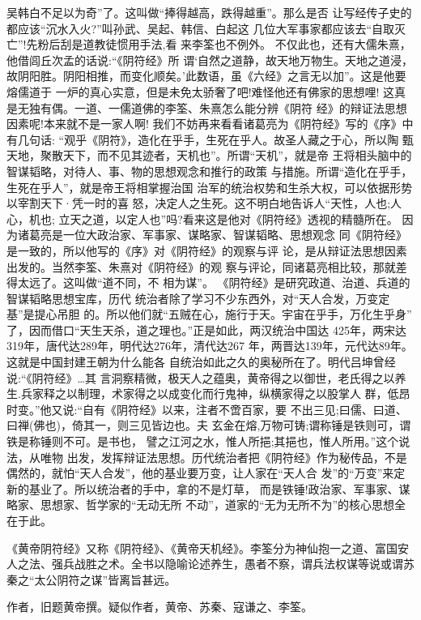 \documentclass[12pt,UTF8]{ctexbook}
\begin{document}
吴韩白不足以为奇”了。这叫做“捧得越高，跌得越重”。那么是否
让写经传子史的都应该“沉水入火?”叫孙武、吴起、韩信、白起这
几位大军事家都应该去“自取灭亡”!先粉后刮是道教徒惯用手法,看
来李筌也不例外。
不仅此也，还有大儒朱熹，他借闾丘次孟的话说:“《阴符经》所
谓‘自然之道静，故天地万物生。天地之道浸，故阴阳胜。阴阳相推，而变化顺矣。’此数语，虽《六经》之言无以加”。这是他要熔儒道于
一炉的真心实意，但是未免太骄奢了吧!难怪他还有佛家的思想哩!
这真是无独有偶。一道、一儒道佛的李筌、朱熹怎么能分辨《阴符
经》的辩证法思想因素呢!本来就不是一家人啊!
我们不妨再来看看诸葛亮为《阴符经》写的《序》中有几句话:
“观乎《阴符》，造化在乎手，生死在乎人。故圣人藏之于心，所以陶
甄天地，聚散天下，而不见其迹者，天机也”。所谓“天机”，就是帝
王将相头脑中的智谋韬略，对待人、事、物的思想观念和推行的政策
与措施。所谓“造化在乎手，生死在乎人”，就是帝王将相掌握治国
治军的统治权势和生杀大权，可以依据形势以宰割天下·凭一时的喜
怒，决定人之生死。这不明白地告诉人“天性，人也;人心，机也;
立天之道，以定人也”吗?看来这是他对《阴符经》透视的精髓所在。
因为诸葛亮是一位大政治家、军事家、谋略家、智谋韬略、思想观念
同《阴符经》是一致的，所以他写的《序》对《阴符经》的观察与评
论，是从辩证法思想因素出发的。当然李筌、朱熹对《阴符经》的观
察与评论，同诸葛亮相比较，那就差得太远了。这叫做“道不同，不
相为谋”。
《阴符经》是研究政道、治道、兵道的智谋韬略思想宝库，历代
统治者除了学习不少东西外，对“天人合发，万变定基”是提心吊胆
的。所以他们就“五贼在心，施行于天。宇宙在乎手，万化生乎身”
了，因而借口“天生天杀，道之理也。”正是如此，两汉统治中国达
425年，两宋达319年，唐代达289年，明代达276年，清代达267
年，两晋达139年，元代达89年。这就是中国封建王朝为什么能各
自统治如此之久的奥秘所在了。明代吕坤曾经说:“《阴符经》…其
言洞察精微，极天人之蕴奥，黄帝得之以御世，老氏得之以养生.兵家释之以制理，术家得之以成变化而行鬼神，纵横家得之以股掌人
群，低昂时变。”他又说:“自有《阴符经》以来，注者不啻百家，要
不出三见;曰儒、曰道、曰禅(佛也)，倚其一，则三见皆边也。夫
玄金在熔,万物可铸;谓称锤是铁则可，谓铁是称锤则不可。是书也，
譬之江河之水，惟人所挹;其挹也，惟人所用。”这个说法，从唯物
出发，发挥辩证法思想。历代统治者把《阴符经》作为秘传品，不是
偶然的，就怕“天人合发”，他的基业要万变，让人家在“天人合
发”的“万变”来定新的基业了。所以统治者的手中，拿的不是灯草，
而是铁锤!政治家、军事家、谋略家、思想家、哲学家的“无动无所
不动”，道家的“无为无所不为”的核心思想全在于此。


《黄帝阴符经》又称《阴符经》、《黄帝天机经》。李筌分为神仙抱一之道、富国安人之法、强兵战胜之术。全书以隐喻论述养生，愚者不察，谓兵法权谋等说或谓苏秦之“太公阴符之谋”皆离旨甚远。

作者，旧题黄帝撰。疑似作者，黄帝、苏秦、寇谦之、李筌。
\end{document}
